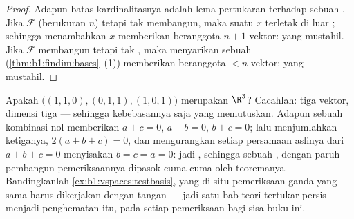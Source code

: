 \begin{proof}
Adapun batas kardinalitasnya adalah lema pertukaran terhadap sebuah . Jika
$\mathcal{F}$ (berukuran $n$)  tetapi tak membangun, maka suatu $x$ terletak
di luar ; sehingga menambahkan $x$ memberikan  beranggota $n + 1$
vektor: yang mustahil. Jika $\mathcal{F}$ membangun tetapi tak ,
maka menyarikan sebuah  (\cref{thm:b1:findim:bases}~(1)) memberikan  beranggota
$< n$ vektor: yang mustahil.
\end{proof}

\begin{example}
\label{ex:b1:findim:twoofthreerun}
Apakah $\bigl((1,1,0), (0,1,1), (1,0,1)\bigr)$ merupakan  $\R^3$?
Cacahlah: tiga vektor, dimensi tiga --- sehingga kebebasannya saja yang
memutuskan. Adapun sebuah kombinasi nol memberikan $a + c = 0$, $a + b = 0$, $b +
c = 0$; lalu menjumlahkan ketiganya, $2(a + b + c) = 0$, dan mengurangkan
setiap persamaan aslinya dari $a + b + c = 0$ menyisakan $b = c = a =
0$: jadi , sehingga sebuah , dengan paruh pembangun
pemeriksaannya dipasok cuma-cuma oleh teoremanya. Bandingkanlah
\cref{ex:b1:vspaces:testbasis}, yang di situ pemeriksaan ganda yang sama
harus dikerjakan dengan tangan --- jadi satu bab teori
tertukar persis menjadi penghematan itu, pada setiap pemeriksaan  bagi
sisa buku ini.
\end{example}

